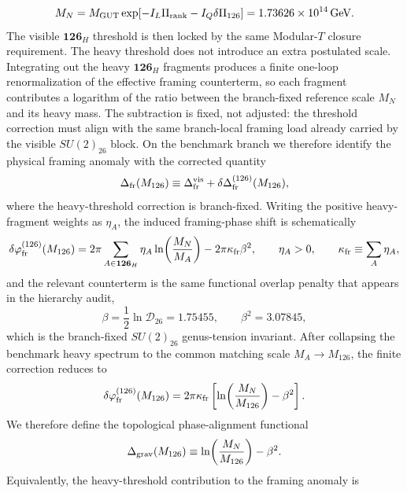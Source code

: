\documentclass[11pt]{article}
\begin{document}
\begin{equation}
 M_N
 =
 M_{\rm GUT}\exp\!\left[-I_L\Pi_{\rm rank}-I_Q\delta\Pi_{126}\right]
 = 1.73626\times10^{14}\,\mathrm{GeV}.
\end{equation}
The visible $\mathbf{126}_H$ threshold is then locked by the same Modular-$T$ closure requirement. The heavy threshold does not introduce an extra postulated scale. Integrating out the heavy $\mathbf{126}_H$ fragments produces a finite one-loop renormalization of the effective framing counterterm, so each fragment contributes a logarithm of the ratio between the branch-fixed reference scale $M_N$ and its heavy mass. The subtraction is fixed, not adjusted: the threshold correction must align with the same branch-local framing load already carried by the visible $SU(2)_{26}$ block. On the benchmark branch we therefore identify the physical framing anomaly with the corrected quantity
\begin{equation}
 \Delta_{\rm fr}(M_{126})
 \equiv
 \Delta_{\rm fr}^{\rm vis}
 +
 \delta\Delta_{\rm fr}^{(126)}(M_{126}),
\end{equation}
where the heavy-threshold correction is branch-fixed. Writing the positive heavy-fragment weights as $\eta_A$, the induced framing-phase shift is schematically
\begin{equation}
 \delta\varphi_{\rm fr}^{(126)}(M_{126})
 =
 2\pi\sum_{A\in \mathbf{126}_H}\eta_A\ln\!\left(\frac{M_N}{M_A}\right)
 -
 2\pi\kappa_{\rm fr}\beta^2,
 \qquad
 \eta_A>0,
 \qquad
 \kappa_{\rm fr}\equiv\sum_A\eta_A,
\end{equation}
and the relevant counterterm is the same functional overlap penalty that appears in the hierarchy audit,
\begin{equation}
 \beta
 = \frac12\ln \mathcal D_{26}=1.75455,
 \qquad
 \beta^2=3.07845,
\end{equation}
which is the branch-fixed $SU(2)_{26}$ genus-tension invariant. After collapsing the benchmark heavy spectrum to the common matching scale $M_A\to M_{126}$, the finite correction reduces to
\begin{equation}
 \delta\varphi_{\rm fr}^{(126)}(M_{126})
 =
 2\pi\kappa_{\rm fr}\left[\ln\!\left(\frac{M_N}{M_{126}}\right)-\beta^2\right].
\end{equation}
We therefore define the topological phase-alignment functional
\begin{equation}
 \Delta_{\rm grav}(M_{126})
 \equiv
 \ln\!\left(\frac{M_N}{M_{126}}\right)-\beta^2.
\end{equation}
Equivalently, the heavy-threshold contribution to the framing anomaly is
\end{document}
